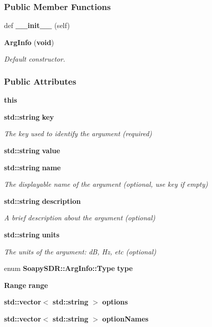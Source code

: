 \subsubsection*{Public Member Functions}
\begin{DoxyCompactItemize}
\item 
def {\bf \+\_\+\+\_\+init\+\_\+\+\_\+} (self)
\item 
{\bf Arg\+Info} ({\bf void})
\begin{DoxyCompactList}\small\item\em Default constructor. \end{DoxyCompactList}\end{DoxyCompactItemize}
\subsubsection*{Public Attributes}
\begin{DoxyCompactItemize}
\item 
{\bf this}
\item 
{\bf std\+::string} {\bf key}
\begin{DoxyCompactList}\small\item\em The key used to identify the argument (required) \end{DoxyCompactList}\item 
{\bf std\+::string} {\bf value}
\item 
{\bf std\+::string} {\bf name}
\begin{DoxyCompactList}\small\item\em The displayable name of the argument (optional, use key if empty) \end{DoxyCompactList}\item 
{\bf std\+::string} {\bf description}
\begin{DoxyCompactList}\small\item\em A brief description about the argument (optional) \end{DoxyCompactList}\item 
{\bf std\+::string} {\bf units}
\begin{DoxyCompactList}\small\item\em The units of the argument\+: dB, Hz, etc (optional) \end{DoxyCompactList}\item 
enum {\bf Soapy\+S\+D\+R\+::\+Arg\+Info\+::\+Type} {\bf type}
\item 
{\bf Range} {\bf range}
\item 
{\bf std\+::vector}$<$ {\bf std\+::string} $>$ {\bf options}
\item 
{\bf std\+::vector}$<$ {\bf std\+::string} $>$ {\bf option\+Names}
\end{DoxyCompactItemize}
